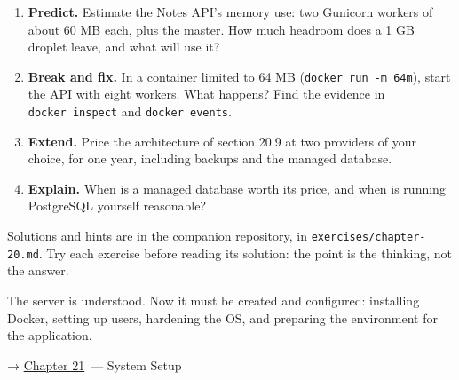 \begin{enumerate}
\def\labelenumi{\arabic{enumi}.}
\tightlist
\item
  \textbf{Predict.} Estimate the Notes API's memory use: two Gunicorn workers of about 60 MB each, plus the master. How much headroom does a 1 GB droplet leave, and what will use it?
\item
  \textbf{Break and fix.} In a container limited to 64 MB (\texttt{docker\ run\ -m\ 64m}), start the API with eight workers. What happens? Find the evidence in \texttt{docker\ inspect} and \texttt{docker\ events}.
\item
  \textbf{Extend.} Price the architecture of section 20.9 at two providers of your choice, for one year, including backups and the managed database.
\item
  \textbf{Explain.} When is a managed database worth its price, and when is running PostgreSQL yourself reasonable?
\end{enumerate}

\noindent{}Solutions and hints are in the companion repository, in \texttt{exercises/}\allowbreak{}\texttt{chapter-20.md}. Try each exercise before reading its solution: the point is the thinking, not the answer.

\label{20-server-fundamentals:whats-next}

The server is understood. Now it must be created and configured: installing Docker, setting up users, hardening the OS, and preparing the environment for the application.

\noindent{}→ \hyperref[ch:21-system-setup]{Chapter 21}~--- System Setup
